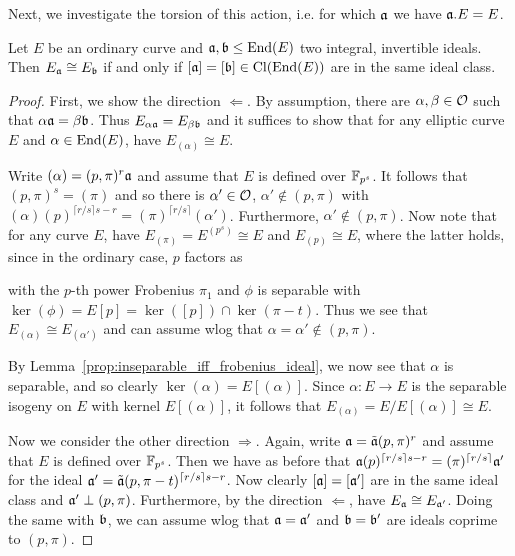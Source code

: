Next, we investigate the torsion of this action, i.e. for which $\mathfrak{a}$ we have $\mathfrak{a}.E = E$.
\begin{lemma}
    Let $E$ be an ordinary curve and $\mathfrak{a}, \mathfrak{b} \leq \mathrm{End}(E)$ two integral, invertible ideals.
    Then $E_{\mathfrak{a}} \cong E_{\mathfrak{b}}$ if and only if $[\mathfrak{a}] = [\mathfrak{b}] \in \mathrm{Cl}(\mathrm{End}(E))$ are in the same ideal class.
\end{lemma}
\begin{proof}
    First, we show the direction $\Leftarrow$.
    By assumption, there are $\alpha, \beta \in \mathcal{O}$ such that $\alpha\mathfrak{a} = \beta\mathfrak{b}$.
    Thus $E_{\alpha\mathfrak{a}} = E_{\beta\mathfrak{b}}$ and it suffices to show that for any elliptic curve $E$ and $\alpha \in \mathrm{End}(E)$, have $E_{(\alpha)} \cong E$.

    Write $(\alpha) = (p, \pi)^r \mathfrak{a}$ and assume that $E$ is defined over $\mathbb{F}_{p^s}$.
    It follows that $(p, \pi)^s = (\pi)$ and so there is $\alpha' \in \mathcal{O}$, $\alpha' \notin (p, \pi)$ with $(\alpha)(p)^{\lceil r/s \rceil s - r} = (\pi)^{\lceil r/s \rceil} (\alpha')$.
    Furthermore, $\alpha' \notin (p, \pi)$.
    Now note that for any curve $E$, have $E_{(\pi)} = E^{(p^s)} \cong E$ and $E_{(p)} \cong E$, where the latter holds, since in the ordinary case, $p$ factors as
    \begin{center}
    \end{center}
    with the $p$-th power Frobenius $\pi_1$ and $\phi$ is separable with $\ker(\phi) = E[p] = \ker([p]) \cap \ker(\pi - t)$.
    Thus we see that $E_{(\alpha)} \cong E_{(\alpha')}$ and can assume wlog that $\alpha = \alpha' \notin (p, \pi)$.

    By Lemma~\ref{prop:inseparable_iff_frobenius_ideal}, we now see that $\alpha$ is separable, and so clearly $\ker(\alpha) = E[(\alpha)]$.
    Since $\alpha: E \to E$ is the separable isogeny on $E$ with kernel $E[(\alpha)]$, it follows that $E_{(\alpha)} = E/E[(\alpha)] \cong E$.

    Now we consider the other direction $\Rightarrow$.
    Again, write $\mathfrak{a} = \tilde{\mathfrak{a}}(p, \pi)^r$ and assume that $E$ is defined over $\mathbb{F}_{p^s}$.
    Then we have as before that $\mathfrak{a} (p)^{\lceil r/s \rceil s - r} = (\pi)^{\lceil r/s \rceil} \mathfrak{a}'$ for the ideal $\mathfrak{a}' = \tilde{\mathfrak{a}} (p, \pi - t)^{\lceil r/s \rceil s - r}$.
    Now clearly $[\mathfrak{a}] = [\mathfrak{a}']$ are in the same ideal class and $\mathfrak{a}' \perp (p, \pi)$.
    Furthermore, by the direction $\Leftarrow$, have $E_{\mathfrak{a}} \cong E_{\mathfrak{a}'}$.
    Doing the same with $\mathfrak{b}$, we can assume wlog that $\mathfrak{a} = \mathfrak{a}'$ and $\mathfrak{b} = \mathfrak{b}'$ are ideals coprime to $(p, \pi)$.


\end{proof}

